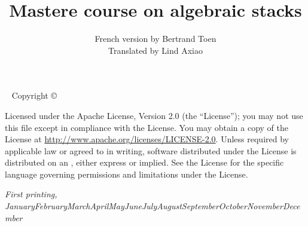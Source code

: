 \documentclass{tufte-book} %
\title{Mastere course on algebraic stacks} %
\author{French version by Bertrand Toen\\
Translated by Lind Axiao} %
\newcommand{\monthyear}{\ifcase\month\or January\or February\or March\or April\or May\or June\or July\or August\or September\or October\or November\or December\fi\space\number\year} %
\newcommand{\openepigraph}[2]{ %
\begin{fullwidth}
\sffamily\large
\begin{doublespace}
\noindent\allcaps{#1}\\ %
\noindent\allcaps{#2} %
\end{doublespace}
\end{fullwidth}
}
\numberwithin{dummy}{section}
\begin{document}
\frontmatter




\maketitle %


\newpage
\begin{fullwidth}
~\vfill
\thispagestyle{empty}
\setlength{\parindent}{0pt}
\setlength{\parskip}{\baselineskip}
Copyright \copyright\ \the\year\ \thanklessauthor

\par{}

\par{}

\par Licensed under the Apache License, Version 2.0 (the ``License''); you may not use this file except in compliance with the License. You may obtain a copy of the License at \url{http://www.apache.org/licenses/LICENSE-2.0}. Unless required by applicable law or agreed to in writing, software distributed under the License is distributed on an , either express or implied. See the License for the specific language governing permissions and limitations under the License.

\par\textit{First printing, \monthyear}
\end{fullwidth}
\end{document}
